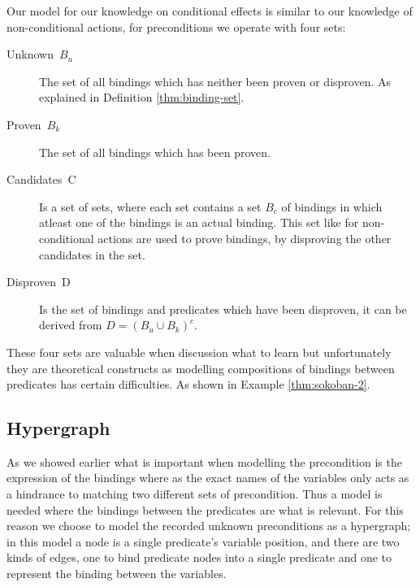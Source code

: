 \documentclass[../Master.tex]{subfiles}
\begin{document}
Our model for our knowledge on conditional effects is similar to
our knowledge of non-conditional actions, for preconditions we operate
with four sets:
\begin{description}
	\item [{Unknown~$B_u$}] The set of all bindings which has
	neither been proven or disproven. As explained in Definition \ref{thm:binding-set}.
	\item [{Proven~$B_k$}] The set of all bindings which has been
	proven.
	\item [{Candidates~C}] Is a set of sets, where each set contains a set $B_c$
	of bindings in which atleast one of the bindings is an actual binding.
	This set like for non-conditional actions are used to prove bindings,
	by disproving the other candidates in the set.
	\item [{Disproven~D}] Is the set of bindings and predicates which have
	been disproven, it can be derived from $D=\left(B_u\cup B_k\right)^{c}$.
\end{description}
These four sets are valuable when discussion what to learn but unfortunately
they are theoretical constructs as modelling compositions of bindings
between predicates has certain difficulties. As shown in Example \ref{thm:sokoban-2}.

	
	\subsection*{Hypergraph}
	
	As we showed earlier what is important when modelling the precondition
	is the expression of the bindings where as the exact names of the
	variables only acts as a hindrance to matching two different sets
	of precondition. Thus a model is needed where the bindings between
	the predicates are what is relevant. For this reason we choose to
	model the recorded unknown preconditions as a hypergraph; in this
	model a node is a single predicate's variable position, and there
	are two kinds of edges, one to bind predicate nodes into a single
	predicate and one to represent the binding between the variables.
	
\end{document}
